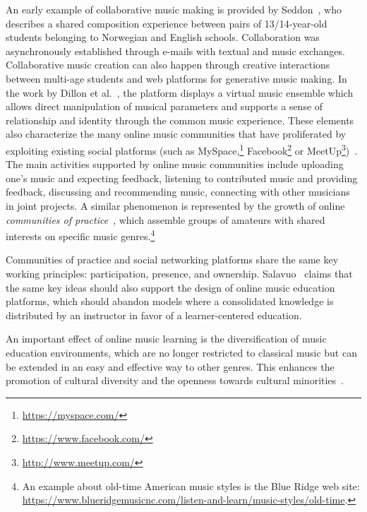 \documentclass[journal]{IEEEtran}
\begin{document}
An early example of collaborative music making is provided by Seddon~\cite{seddon2006collaborative}, who describes a shared composition experience between pairs of 13/14-year-old students belonging to Norwegian and English schools. Collaboration was asynchronously established through e-mails with textual and music exchanges. 
Collaborative music creation can also happen through creative interactions between multi-age students and web platforms for generative music making. In the work by Dillon et al.~\cite{dillon2009communities}, the platform displays a virtual music ensemble which allows direct manipulation of musical parameters and supports a sense of relationship and identity through the common music experience. These elements also characterize the many online music communities that have proliferated by exploiting existing social platforms (such as MySpace,\footnote{\url{https://myspace.com/}}  Facebook\footnote{\url{https://www.facebook.com/}} or MeetUp\footnote{\url{http://www.meetup.com/}})~\cite{salavuo2008social}. The main activities supported by online music communities include uploading one's music and expecting feedback, listening to contributed music and providing feedback, discussing and recommending music, connecting with other musicians in joint projects. 
%
A similar phenomenon is represented by the growth of online \textit{communities of practice}~\cite{waldron2009exploring,wenger1999communities}, which assemble groups of amateurs with shared interests on specific music genres.\footnote{An example about old-time American music styles is the Blue Ridge web site: \url{https://www.blueridgemusicnc.com/listen-and-learn/music-styles/old-time}.}


Communities of practice and social networking platforms share the same key working principles: participation, presence, and ownership. Salavuo~\cite{salavuo2008social} claims that the same key ideas should also support the design of online music education platforms, which should abandon models where a consolidated knowledge is distributed by an instructor in favor of a learner-centered education.

An important effect of online music learning is the diversification of music education environments, which are no longer restricted to classical music but can be extended in an easy and effective way to other genres. This enhances the promotion of cultural diversity and the openness towards cultural minorities~\cite{ruthmann2012music}. 



\end{document}
